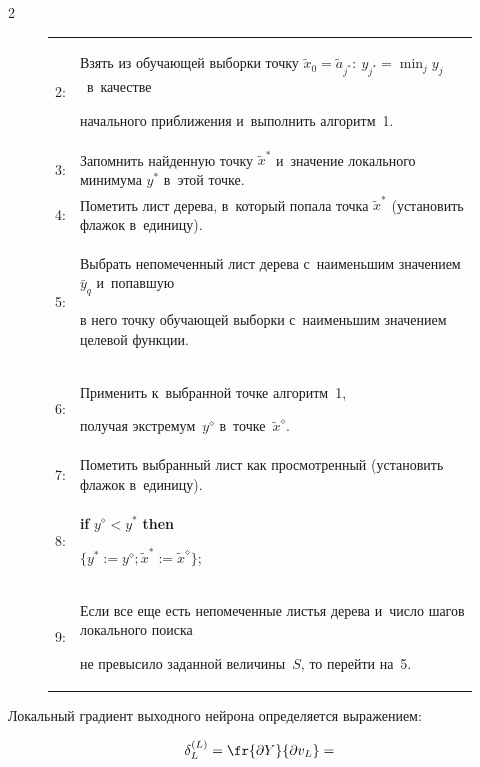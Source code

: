 \begin{multicols}{2}
\begin{figure}[b]
{\begin{center}
\begin{tabular}{l p{146.7mm}}
2: &Взять из обучающей выборки точку $\tilde{x}_0=\tilde{a}_{j^{*}}: \ y_{j^{*}}= \min_j y_j$ \ в~качестве


начального приближения и~выполнить алгоритм~1.\\


3: &Запомнить найденную точку  $\tilde{x}^{*}$ и~значение локального минимума $y^{*}$ в~этой точке.\\


4: &Пометить лист дерева, в~который попала точка $\tilde{x}^{*}$ (установить флажок в~единицу).\\


5: &Выбрать непомеченный лист дерева с~наименьшим значением $\bar{y}_q$ и~попавшую


в него точку обучающей выборки с~наименьшим значением целевой функции.\\


6: &Применить к~выбранной точке алгоритм~1, 


получая экстремум~$y^{\diamond}$ в~точке~$\tilde{x}^{\diamond}$.\\


7: &Пометить выбранный лист как просмотренный (установить флажок в~единицу).\\


8: &\textbf{if}  $y^{\diamond} < y^{*}$  \textbf{then} 


$\{y^{*}:=y^{\diamond}; \tilde{x}^{*}:= \tilde{x}^{\diamond} \}$;\\


9: &Если все еще есть непомеченные листья дерева и~число шагов локального поиска


не превысило заданной величины~$S$, то перейти на~5.\\


\hline


\end{tabular}


\end{center}


}


\end{figure}





Локальный градиент выходного нейрона определяется выражением:


\begin{multline}


\label{Del1}


\delta_L^{(L)}=\fr{\partial Y} {\partial v_L}=



\end{multline}
\end{multicols}
